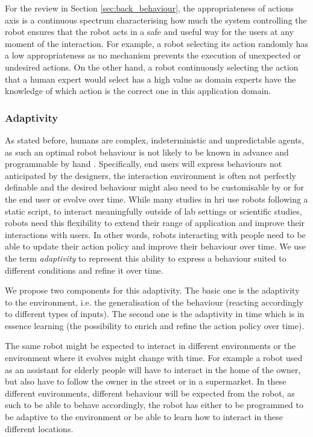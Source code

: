     For the review in Section \ref{sec:back_behaviour}, the appropriateness of actions axis is a continuous spectrum characterising how much the system controlling the robot ensures that the robot acts in a safe and useful way for the users at any moment of the interaction. For example, a robot selecting its action randomly has a low appropriateness as no mechanism prevents the execution of unexpected or undesired actions. On the other hand, a robot continuously selecting the action that a human expert would select has a high value as domain experts have the knowledge of which action is the correct one in this application domain.


\subsubsection{Adaptivity}	\label{ssec:adap}
    As stated before, humans are complex, indeterministic and unpredictable agents, as such an optimal robot behaviour is not likely to be known in advance and programmable by hand \citep{dautenhahn2004robots,argall2009survey}. Specifically, end users will express behaviours not anticipated by the designers, the interaction environment is often not perfectly definable and the desired behaviour might also need to be customisable by or for the end user or evolve over time. While many studies in \gls{hri} use robots following a static script, to interact meaningfully outside of lab settings or scientific studies, robots need this flexibility to extend their range of application and improve their interactions with users. In other words, robots interacting with people need to be able to update their action policy and improve their behaviour over time. We use the term \emph{adaptivity} to represent this ability to express a behaviour suited to different conditions and refine it over time. 
    
    We propose two components for this adaptivity. The basic one is the adaptivity to the environment, i.e. the generalisation of the behaviour (reacting accordingly to different types of inputs). The second one is the adaptivity in time which is in essence learning (the possibility to enrich and refine the action policy over time). 
	
    The same robot might be expected to interact in different environments or the environment where it evolves might change with time. For example a robot used as an assistant for elderly people will have to interact in the home of the owner, but also have to follow the owner in the street or in a supermarket. In these different environments, different behaviour will be expected from the robot, as such to be able to behave accordingly, the robot has either to be programmed to be adaptive to the environment or be able to learn how to interact in these different locations.

